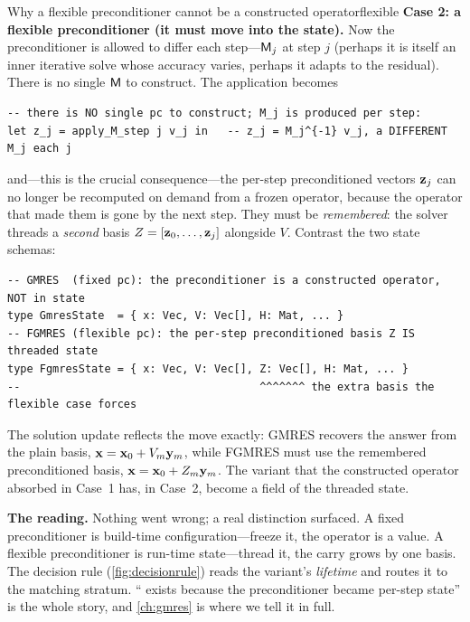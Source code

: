 \begin{workedexample}{Why a flexible preconditioner cannot be a constructed
operator}{flexible}
\textbf{Case 2: a flexible preconditioner (it must move into the state).} Now the
preconditioner is allowed to differ each step---$\mathsf{M}_j$ at step $j$ (perhaps it is
itself an inner iterative solve whose accuracy varies, perhaps it adapts to the
residual). There is no single $\mathsf{M}$ to construct. The application becomes
\begin{lstlisting}[style=l4style]
-- there is NO single pc to construct; M_j is produced per step:
let z_j = apply_M_step j v_j in   -- z_j = M_j^{-1} v_j, a DIFFERENT M_j each j
\end{lstlisting}
and---this is the crucial consequence---the per-step preconditioned vectors $\mathbf{z}_j$
can no longer be recomputed on demand from a frozen operator, because the operator
that made them is gone by the next step. They must be \emph{remembered}: the solver
threads a \emph{second} basis $Z = [\mathbf{z}_0, \dots, \mathbf{z}_j]$ alongside $V$. Contrast the
two state schemas:
\begin{lstlisting}[style=l4style]
-- GMRES  (fixed pc): the preconditioner is a constructed operator, NOT in state
type GmresState  = { x: Vec, V: Vec[], H: Mat, ... }
-- FGMRES (flexible pc): the per-step preconditioned basis Z IS threaded state
type FgmresState = { x: Vec, V: Vec[], Z: Vec[], H: Mat, ... }
--                                     ^^^^^^^ the extra basis the flexible case forces
\end{lstlisting}
The solution update reflects the move exactly: GMRES recovers the answer from the
plain basis, $\mathbf{x} = \mathbf{x}_0 + V_m \mathbf{y}_m$, while FGMRES must use the remembered
preconditioned basis, $\mathbf{x} = \mathbf{x}_0 + Z_m \mathbf{y}_m$. The variant that the constructed
operator absorbed in Case~1 has, in Case~2, become a field of the threaded state.

\textbf{The reading.} Nothing went wrong; a real distinction surfaced. A fixed
preconditioner is build-time configuration---freeze it, the operator is a value. A
flexible preconditioner is run-time state---thread it, the carry grows by one basis.
The decision rule (\cref{fig:decisionrule}) reads the variant's \emph{lifetime} and
routes it to the matching stratum. `` exists because the preconditioner
became per-step state'' is the whole story, and \cref{ch:gmres} is where we tell it in
full.
\end{workedexample}

